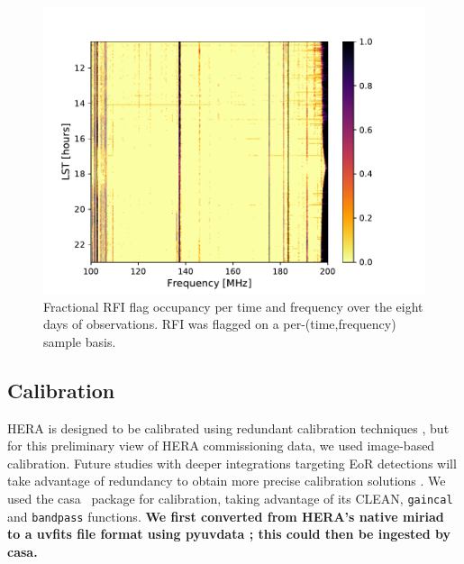 \documentclass[twocolumn, trackchanges]{aastex61}
\newcommand{\casa}{{\sc casa}}
\newcommand{\edited}[1]{{\bf \color{blue} #1}}
\begin{document}
\begin{figure}
\centering
\includegraphics[scale=0.6]{frac_occ.pdf}
\caption{Fractional RFI flag occupancy per time and frequency over the eight days of observations. RFI was flagged on a per-(time,frequency) sample basis.}
\label{fig:rfi}
\end{figure}

\subsection{Calibration}
\label{subsec:cal}

HERA is designed to be calibrated using redundant calibration techniques \citep{DillonParsons16}, but for this preliminary view of HERA commissioning data, we used image-based calibration. Future studies with deeper integrations targeting EoR detections will take advantage of redundancy to obtain more precise calibration solutions \citep{deBoer17}. We used the \casa\ \citep{casa} package for calibration, taking advantage of its CLEAN, {\tt gaincal} and {\tt bandpass} functions.  \edited{We first converted from HERA's native {\sc miriad} to a {\sc uvfits} file format using {\sc pyuvdata} \citep{pyuvdata}; this could then be ingested by \casa.}
\end{document}
